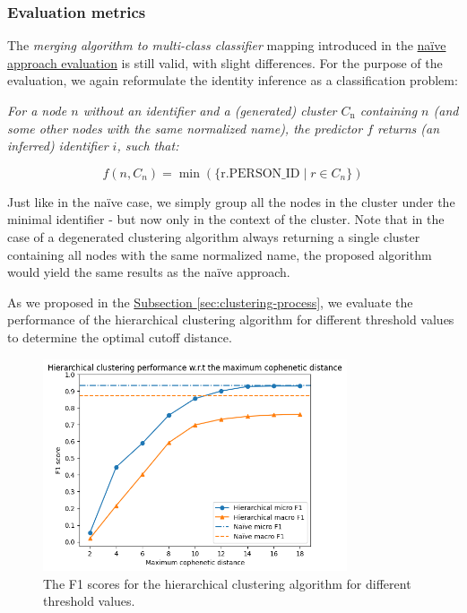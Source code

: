 \subsubsection{Evaluation metrics}

The \textit{merging algorithm to multi-class classifier} mapping introduced in the \hyperref[sec:results-assessment]{naïve approach evaluation} is still valid, with slight differences.
For the purpose of the evaluation, we again reformulate the identity inference as a classification problem:

\textit{For a node $n$ without an identifier and a (generated) cluster $C_{\text{n}}$ containing $n$ (and some other nodes with the same normalized name),
the predictor $f$ returns (an inferred) identifier $i$, such that:}

$$
f(n, C_{n}) = \min(\{\text{r.PERSON\_ID} \mid r \in C_{n}\})
$$

Just like in the naïve case, we simply group all the nodes in the cluster under the minimal identifier - but now only in the context of the cluster.
Note that in the case of a degenerated clustering algorithm always returning a single cluster containing all nodes with the same normalized name, the proposed algorithm would yield the same results as the naïve approach.

As we proposed in the \hyperref[sec:clustering-process]{Subsection \ref*{sec:clustering-process}}, we evaluate the performance of the hierarchical clustering algorithm for different threshold values
to determine the optimal cutoff distance.

\begin{figure}[ht!]
    \captionsetup{width=.9\linewidth}
    \includegraphics[width=0.8\textwidth]{../img/hierarchical-f1.png}
    \centering
    \caption{The F1 scores for the hierarchical clustering algorithm for different threshold values.\protect\footnotemark}
\end{figure}\label{fig:hierarchical-f1}


